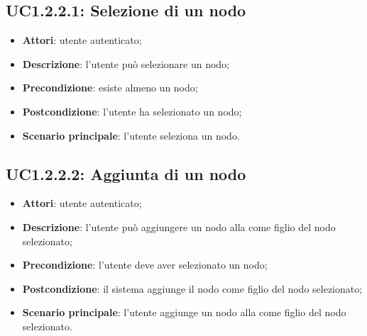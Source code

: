 \subsection{UC1.2.2.1: Selezione di un nodo}
\label{UC1.2.2.1}
\begin{itemize}
\item \textbf{Attori}: utente autenticato;
\item \textbf{Descrizione}: l'utente può selezionare un nodo;
\item \textbf{Precondizione}: esiste almeno un nodo;
\item \textbf{Postcondizione}: l'utente ha selezionato un nodo;
\item \textbf{Scenario principale}:
l'utente seleziona un nodo.
\end{itemize}
\subsection{UC1.2.2.2: Aggiunta di un nodo}
\label{UC1.2.2.2}
\begin{itemize}
\item \textbf{Attori}: utente autenticato;
\item \textbf{Descrizione}: l'utente può aggiungere un nodo alla  come figlio del nodo selezionato;
\item \textbf{Precondizione}: l'utente deve aver selezionato un nodo;
\item \textbf{Postcondizione}: il sistema aggiunge il nodo come figlio del nodo selezionato;
\item \textbf{Scenario principale}:
l'utente aggiunge un nodo alla  come figlio del nodo selezionato.
\end{itemize}
